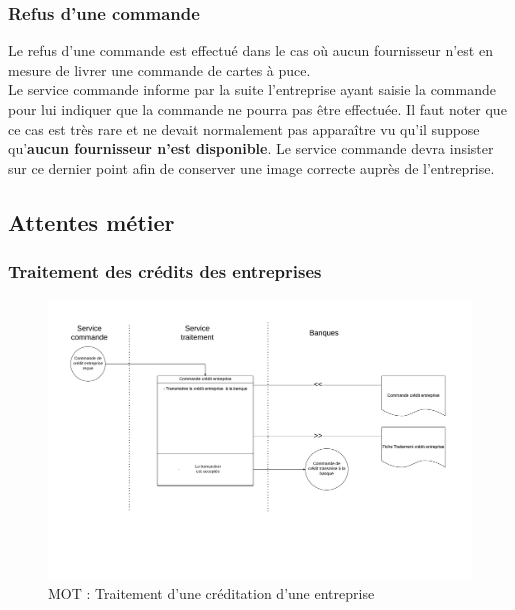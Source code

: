 \subsubsection{Refus d'une commande}

Le refus d'une commande est effectué dans le cas où aucun fournisseur n'est en
mesure de livrer une commande de cartes à puce. \\

Le service commande informe par la suite l'entreprise ayant saisie la commande
pour lui indiquer que la commande ne pourra pas être effectuée. Il faut noter
que ce cas est très rare et ne devait normalement pas apparaître vu qu'il
suppose qu'\textbf{aucun fournisseur n'est disponible}. Le service commande
devra insister sur ce dernier point afin de conserver une image correcte auprès
de l'entreprise.

\subsection{Attentes métier}

\subsubsection{Traitement des crédits des entreprises}

\begin{landscape}
  \begin{figure}[H]
      \centering
      \includegraphics[height=\textwidth]{mot-traitement-credit-entreprise}
      \caption{MOT : Traitement d'une créditation d'une entreprise}
      \label{fig:mot-traitement-credit-entreprise}
  \end{figure}
\end{landscape}


